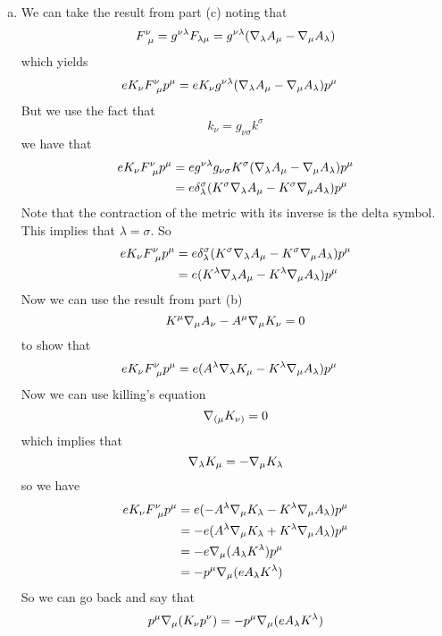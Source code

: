 \documentclass[11pt]{article}
\numberwithin{equation}{section}
\begin{document}
\begin{enumerate}[(a)]
\item
We can take the result from part (c) noting that 
$$F^{\nu}_{\ \mu} = g^{\nu\lambda}F_{\lambda\mu} = g^{\nu\lambda}(\bold\nabla_{\lambda}A_{\mu} - \bold\nabla_{\mu}A_{\lambda})$$
which yields
\begin{align*}
eK_{\nu}F^{\nu}_{\ \mu}p^{\mu} &=   eK_{\nu}g^{\nu\lambda}(\bold\nabla_{\lambda}A_{\mu} - \bold\nabla_{\mu}A_{\lambda})p^{\mu}
\end{align*}
But we use the fact that 
$$k_{\nu} = g_{\nu\sigma}k^{\sigma}$$
we have that
\begin{align*}
eK_{\nu}F^{\nu}_{\ \mu}p^{\mu} &=   eg^{\nu\lambda}g_{\nu\sigma}K^{\sigma}(\bold\nabla_{\lambda}A_{\mu} - \bold\nabla_{\mu}A_{\lambda})p^{\mu}\\
&=   e\delta_{\lambda}^{\sigma}(K^{\sigma}\bold\nabla_{\lambda}A_{\mu} - K^{\sigma}\bold\nabla_{\mu}A_{\lambda})p^{\mu}
\end{align*}
Note that the contraction of the metric with its inverse is the delta symbol. This implies that $\lambda=\sigma$. So
\begin{align*}
eK_{\nu}F^{\nu}_{\ \mu}p^{\mu} &=   e\delta_{\lambda}^{\sigma}(K^{\sigma}\bold\nabla_{\lambda}A_{\mu} - K^{\sigma}\bold\nabla_{\mu}A_{\lambda})p^{\mu}\\
&=  e(K^{\lambda}\bold\nabla_{\lambda}A_{\mu} - K^{\lambda}\bold\nabla_{\mu}A_{\lambda})p^{\mu}
\end{align*}
Now we can use the result from part (b) 
$$K^{\mu}\bold\nabla_{\mu}A_{\nu} - A^{\mu}\bold\nabla_{\mu}K_{\nu} = 0$$
to show that
\begin{align*}
eK_{\nu}F^{\nu}_{\ \mu}p^{\mu} &=  e(A^{\lambda}\bold\nabla_{\lambda}K_{\mu} - K^{\lambda}\bold\nabla_{\mu}A_{\lambda})p^{\mu}
\end{align*}
Now we can use killing's equation 
$$\bold\nabla_{(\mu}K_{\nu)} = 0$$
which implies that
$$\bold\nabla_{\lambda}K_{\mu} = -\bold\nabla_{\mu}K_{\lambda}$$
so we have
\begin{align*}
eK_{\nu}F^{\nu}_{\ \mu}p^{\mu} &=  e(-A^{\lambda}\bold\nabla_{\mu}K_{\lambda} - K^{\lambda}\bold\nabla_{\mu}A_{\lambda})p^{\mu}\\
&=  -e(A^{\lambda}\bold\nabla_{\mu}K_{\lambda} + K^{\lambda}\bold\nabla_{\mu}A_{\lambda})p^{\mu}\\
&=  -e\bold\nabla_{\mu}(A_{\lambda}K^{\lambda})p^{\mu}\\
&=  -p^{\mu}\bold\nabla_{\mu}(eA_{\lambda}K^{\lambda})
\end{align*}
So we can go back and say that
\begin{align*}
p^{\mu}\grad_{\mu}(K_{\nu}p^{\nu}) &= -p^{\mu}\grad_{\mu}(eA_{\lambda}K^{\lambda})\\

\end{align*}
\end{enumerate}
\end{document}

